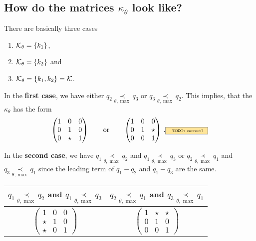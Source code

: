 \subsection{How do the matrices $\kappa_\theta$ look like?}
There are basically three cases
\begin{enumerate}
  \item $\mathcal{K}_\theta=\{k_1\}$,
  \item $\mathcal{K}_\theta=\{k_2\}$ and
  \item $\mathcal{K}_\theta=\{k_1,k_2\}=\mathcal{K}$.
\end{enumerate}
\begin{comment}
  The first two cases are similar, the last is different.
\end{comment}
In the \textbf{first case}, we have either
$q_2 \underset{\theta,\max}{\prec} q_3$ or
$q_3 \underset{\theta,\max}{\prec} q_2$.
This implies, that the  $\kappa_\theta$ has the form
\[
  \begin{pmatrix}
    1 & 0 & 0
  \\0 & 1 & 0
  \\0 & \star & 1
  \end{pmatrix}
  \qquad
  \text{or}
  \qquad
  \begin{pmatrix}
    1 & 0 & 0
  \\0 & 1 & \star
  \\0 & 0 & 1
  \end{pmatrix}
  \,.
  \TODO[correct?]
\]

In the \textbf{second case}, we have $q_1 \underset{\theta,\max}{\prec} q_2$
and $q_1 \underset{\theta,\max}{\prec} q_3$ or
$q_2 \underset{\theta,\max}{\prec} q_1$ and
$q_3 \underset{\theta,\max}{\prec} q_1$ since the leading term of $q_1-q_2$ and
$q_1-q_3$ are the same.
\TODO[\dots]
\begin{center}
  \begin{tabular}{c|c}
    $q_1 \underset{\theta,\max}{\prec} q_2$ and
    $q_1 \underset{\theta,\max}{\prec} q_3$
    &
    $q_2 \underset{\theta,\max}{\prec} q_1$ and
    $q_3 \underset{\theta,\max}{\prec} q_1$
    \tabularnewline
    \hline 
    $\begin{pmatrix}1 & 0 & 0\\
    \star & 1 & 0\\
    \star & 0 & 1
  \end{pmatrix}$ & $\begin{pmatrix}1 & \star & \star\\
    0 & 1 & 0\\
    0 & 0 & 1
  \end{pmatrix}$\tabularnewline
  \end{tabular}
\end{center}

